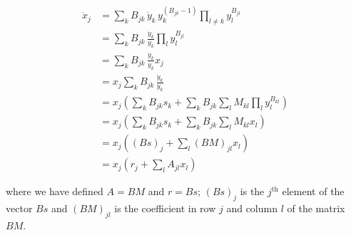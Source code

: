 \documentclass{article}
\begin{document}
\begin{equation}
\label{eq:quasimonodt}
\begin{aligned}
\dot{x}_j &= \sum_k B_{jk}\, \dot{y}_k \, y_{k}^{(B_{jk} -1)} \prod_{l \neq k} y_{l}^{B_{jl}}\\
&=\sum_k B_{jk}\, \frac{\dot{y}_k}{y_k} \prod_{l} y_{l}^{B_{jl}}\\
&=\sum_k B_{jk}\, \frac{\dot{y}_k}{y_k} x_j\\
&=x_j \sum_k B_{jk}\, \frac{\dot{y}_k}{y_k} \\
&=x_j \left(\sum_k B_{jk} s_k + \sum_k B_{jk} \sum_l M_{kl} \prod_l y_l^{B_{kl}} \right)\\
&=x_j \left(\sum_k B_{jk} s_k + \sum_k B_{jk} \sum_l M_{kl} x_l \right)\\
&=x_j \left((B s)_j + \sum_l (B M)_{jl} x_l \right)\\
&=x_j \left(r_j + \sum_l A_{jl} x_l \right)
\end{aligned}
\end{equation}

where we have defined \(A = BM\) and \(r = B s\); \((Bs)_j\) is the
\(j^{\text{th}}\) element of the vector \(Bs\) and \((B M)_{jl}\) is the
coefficient in row \(j\) and column \(l\) of the matrix \(BM\).
\end{document}

